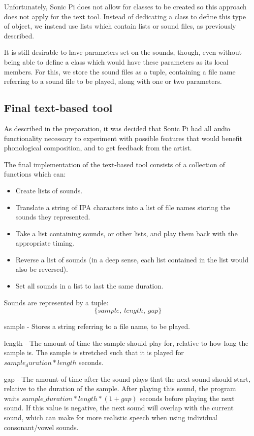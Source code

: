 \documentclass[12pt,a4paper,oneside,openright]{report}
\begin{document}
Unfortunately, Sonic Pi does not allow for classes to be created so this approach does not apply for the text tool. Instead of dedicating a class to define this type of object, we instead use lists which contain lists or sound files, as previously described.

It is still desirable to have parameters set on the sounds, though, even without being able to define a class which would have these parameters as its local members. For this, we store the sound files as a tuple, containing a file name referring to a sound file to be played, along with one or two parameters.

\subsection{Final text-based tool}
As described in the preparation, it was decided that Sonic Pi had all audio functionality necessary to experiment with possible features that would benefit phonological composition, and to get feedback from the artist.

The final implementation of the text-based tool consists of a collection of functions which can:
\begin{itemize}
    \item Create lists of sounds.
    \item Translate a string of IPA characters into a list of file names storing the sounds they represented.
    \item Take a list containing sounds, or other lists, and play them back with the appropriate timing.
    \item Reverse a list of sounds (in a deep sense, each list contained in the list would also be reversed).
    \item Set all sounds in a list to last the same duration.
\end{itemize}

Sounds are represented by a tuple:
\begin{equation*}
    \{sample,\ length,\ gap\}
\end{equation*}

sample - Stores a string referring to a file name, to be played.

length - The amount of time the sample should play for, relative to how long the sample is. The sample is stretched such that it is played for $sample_duration * length$ seconds.

gap - The amount of time after the sound plays that the next sound should start, relative to the duration of the sample. After playing this sound, the program waits $sample\_duration * length * (1 + gap)$ seconds before playing the next sound. If this value is negative, the next sound will overlap with the current sound, which can make for more realistic speech when using individual consonant/vowel sounds.
\newpage
\end{document}
